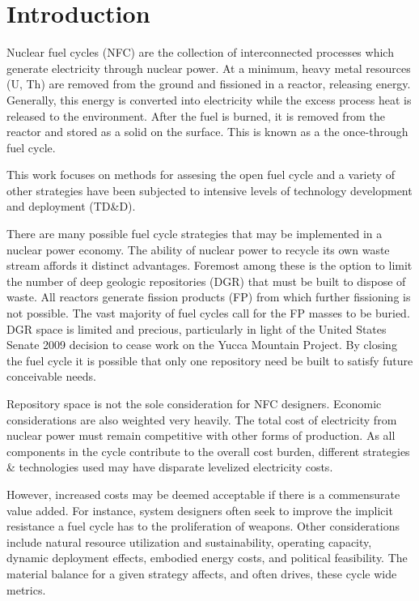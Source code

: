 \chapter{Introduction}
\label{diss_intro}

Nuclear fuel cycles (NFC) are the collection of interconnected processes which 
generate electricity through nuclear power.  
At a minimum, heavy metal resources (U, Th) are removed from the ground
and fissioned in a reactor, releasing energy.  Generally, this energy is converted 
into electricity while the excess process heat is released to the environment.  
After the fuel is burned, it is removed from the reactor and stored as a solid on the surface.
This is known as a the once-through fuel cycle.

This work focuses on methods for assesing the open fuel cycle and a variety of other 
strategies have been subjected to intensive levels of technology development and 
deployment (TD\&D).

There are many possible fuel cycle strategies that may be implemented in a nuclear power economy.
The ability of nuclear power to recycle its own waste stream affords it distinct advantages.  
Foremost among these is the option to limit the number of deep geologic repositories (DGR) 
that must be built to dispose of waste.   All reactors generate fission products (FP) from 
which further fissioning is not possible.  The vast majority of fuel cycles call for the FP masses 
to be buried.  DGR space is limited and precious, particularly in light of the United States Senate 2009
decision to cease work on the Yucca Mountain Project.  
By closing the fuel cycle it is possible  that only one repository need be built to satisfy 
future conceivable needs.

Repository space is not the sole consideration for NFC designers.  Economic considerations 
are also weighted very heavily.  The total cost of electricity from nuclear power must remain competitive 
with other forms of production.  As all components in the cycle contribute to the overall cost burden, 
different strategies \& technologies used may have disparate levelized electricity costs.

However, increased costs may be deemed acceptable if there is a commensurate value added.
For instance, system designers often seek to improve the implicit resistance a fuel cycle 
has to the proliferation of weapons.  Other considerations include natural resource 
utilization and sustainability, operating capacity, dynamic deployment effects,
embodied energy costs, and political feasibility.  The material balance for a given strategy
affects, and often drives, these cycle wide metrics.

